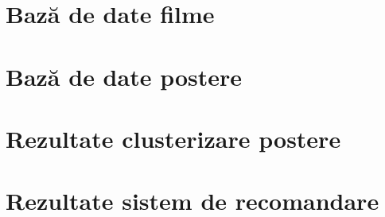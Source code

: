 \section{Bază de date filme}

\section{Bază de date postere}

\section{Rezultate clusterizare postere}

\section{Rezultate sistem de recomandare}
